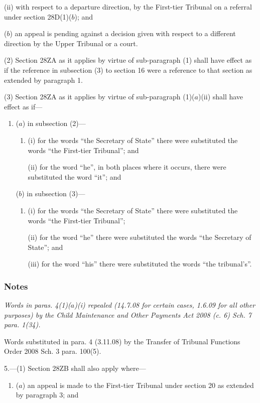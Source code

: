 \documentclass[a4paper]{article}
\newcommand\amendment[1]{\subsubsection*{Notes}{\itshape\frenchspacing\footnotesize #1 \par}}
\begin{document}
{\begin{enumerate}
\begin{enumerate}
(ii) with respect to a departure direction, by the First-tier Tribunal on a referral under section 28D(1)($b$); and
\end{enumerate}

($b$) an appeal is pending against a decision given with respect to a different direction by the Upper Tribunal or a court.
\end{enumerate}

(2) Section 28ZA as it applies by virtue of sub-paragraph (1) shall have effect as if the reference in subsection (3) to section 16 were a reference to that section as extended by paragraph 1.

(3) Section 28ZA as it applies by virtue of sub-paragraph (1)($a$)(ii) shall have effect as if---
\begin{enumerate}\item[]
($a$) in subsection (2)---
\begin{enumerate}\item[]
(i) for the words “the Secretary of State” there were substituted the words “the First-tier Tribunal”; and

(ii) for the word “he”, in both places where it occurs, there were substituted the word “it”; and
\end{enumerate}

($b$) in subsection (3)---
\begin{enumerate}\item[]
(i) for the words “the Secretary of State” there were substituted the words “the First-tier Tribunal”;

(ii) for the word “he” there were substituted the words “the Secretary of State”; and

(iii) for the word “his” there were substituted the words “the tribunal's”.
\end{enumerate}
\end{enumerate}

\amendment{
Words in paras. 4(1)($a$)(i) repealed (14.7.08 for certain cases, 1.6.09 for all other purposes) by the Child Maintenance and Other Payments Act 2008 (c. 6) Sch. 7 para. 1(34).

Words substituted in para. 4 (3.11.08) by the Transfer of Tribunal Functions Order 2008  Sch. 3 para. 100(5).
}

\medskip

5.---(1) Section 28ZB shall also apply where---
\begin{enumerate}\item[]
($a$) an appeal is made to the First-tier Tribunal under section 20 as extended by paragraph 3; and


\end{enumerate}}
\end{document}
